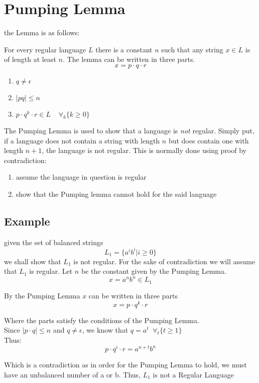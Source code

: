 \documentclass[12pt]{book}
\title{\coursetitle\linebreak\lecturename}
\author{\\Cain Susko\\ 
           \\ \\ \\
      Queen's University 
    \\School of Computing\\}
\begin{document}
\begin{titlepage}
        \maketitle
\end{titlepage}


\section*{Pumping Lemma}
the Lemma is as follows:

For every regular language $L$ there is a constant  $n$ such that any string  $x\in L$ is of length at least $n$.
The lemma can be written in three parts.
\[x=p\cdot q\cdot r\]
\begin{enumerate}
        \item $q\neq\epsilon$
        \item $|pq|\leq n$
        \item $p\cdot q^k \cdot r \in L\;\;\;\;\forall_k\{k \geq 0\}$
\end{enumerate}

The Pumping Lemma is used to show that a language is \textit{not} regular.
Simply put, if a language does not contain a string with length $n$ but does contain one with length $n+1$, the language is not regular.
This is normally done using proof by contradiction:
\begin{enumerate}
        \item assume the language in question is regular
        \item show that the Pumping lemma cannot hold for the said language
\end{enumerate}

\subsection*{Example}
given the set of balanced strings 
\[L_1 = \{a^ib^i|i\geq 0\}\]
we shall show that $L_1$ is not regular. 
For the sake of contradiction we will assume that $L_1$ is regular.
Let $n$ be the constant given by the Pumping Lemma.
\[x=a^nb^n\in L_1\]

By the Pumping Lemma $x$ can be written in three parts  
\[x=p\cdot q^k\cdot r\]

Where the parts satisfy the conditions of the Pumping Lemma.\\
Since $|p\cdot q|\leq n$ and $q\neq\epsilon$, we know that  $q=a^t\;\;\forall_t\{t\geq 1\}$\\
Thus:
\[p\cdot q^i\cdot r = a^{n+t}b^n\]

Which is a contradiction as in order for the Pumping Lemma to hold, we must have an unbalanced number of a or b.
Thus, $L_1$ is not a Regular Language 
\end{document}
